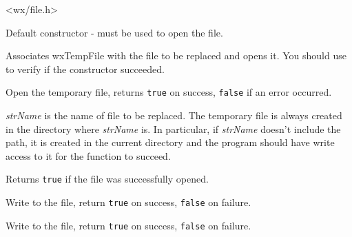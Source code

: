 
<wx/file.h>




\label{wxtempfilewxtempfilector}


Default constructor -  must be used to open the
file.

\label{wxtempfilewxtempfile}


Associates wxTempFile with the file to be replaced and opens it. You should use 
 to verify if the constructor succeeded.

\label{wxtempfileopen}


Open the temporary file, returns {\tt true} on success, {\tt false} if an error
occurred.

{\it strName} is the name of file to be replaced. The temporary file is always
created in the directory where {\it strName} is. In particular, if 
{\it strName} doesn't include the path, it is created in the current directory
and the program should have write access to it for the function to succeed.

\label{wxtempfileisopened}


Returns {\tt true} if the file was successfully opened.

\label{wxtempfilewrite}


Write to the file, return {\tt true} on success, {\tt false} on failure.

\label{wxtempfilewrites}


Write to the file, return {\tt true} on success, {\tt false} on failure.


